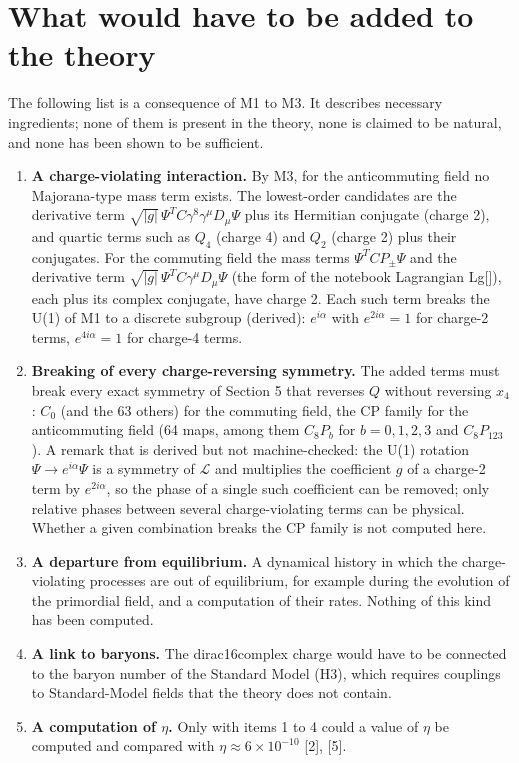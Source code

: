 \documentclass[11pt]{article}
\begin{document}
\section{What would have to be added to the theory}

The following list is a consequence of M1 to M3. It describes necessary ingredients; none of them is present in the theory, none is claimed to be natural, and none has been shown to be sufficient.

\begin{enumerate}
\item \textbf{A charge-violating interaction.} By M3, for the anticommuting field no Majorana-type mass term exists. The lowest-order candidates are the derivative term $\sqrt{|g|}\,\Psi^TC\gamma^8\gamma^\mu D_\mu\Psi$ plus its Hermitian conjugate (charge 2), and quartic terms such as $Q_4$ (charge 4) and $Q_2$ (charge 2) plus their conjugates. For the commuting field the mass terms $\Psi^TCP_\pm\Psi$ and the derivative term $\sqrt{|g|}\,\Psi^TC\gamma^\mu D_\mu\Psi$ (the form of the notebook Lagrangian Lg[]), each plus its complex conjugate, have charge 2. Each such term breaks the U(1) of M1 to a discrete subgroup (derived): $e^{i\alpha}$ with $e^{2i\alpha}=1$ for charge-2 terms, $e^{4i\alpha}=1$ for charge-4 terms.
\item \textbf{Breaking of every charge-reversing symmetry.} The added terms must break every exact symmetry of Section 5 that reverses $Q$ without reversing $x_4$: $C_0$ (and the 63 others) for the commuting field, the CP family for the anticommuting field (64 maps, among them $C_8P_b$ for $b=0,1,2,3$ and $C_8P_{123}$). A remark that is derived but not machine-checked: the U(1) rotation $\Psi\to e^{i\alpha}\Psi$ is a symmetry of $\mathcal L$ and multiplies the coefficient $g$ of a charge-2 term by $e^{2i\alpha}$, so the phase of a single such coefficient can be removed; only relative phases between several charge-violating terms can be physical. Whether a given combination breaks the CP family is not computed here.
\item \textbf{A departure from equilibrium.} A dynamical history in which the charge-violating processes are out of equilibrium, for example during the evolution of the primordial field, and a computation of their rates. Nothing of this kind has been computed.
\item \textbf{A link to baryons.} The dirac16complex charge would have to be connected to the baryon number of the Standard Model (H3), which requires couplings to Standard-Model fields that the theory does not contain.
\item \textbf{A computation of $\eta$.} Only with items 1 to 4 could a value of $\eta$ be computed and compared with $\eta\approx6\times10^{-10}$ [2], [5].
\end{enumerate}
\end{document}
